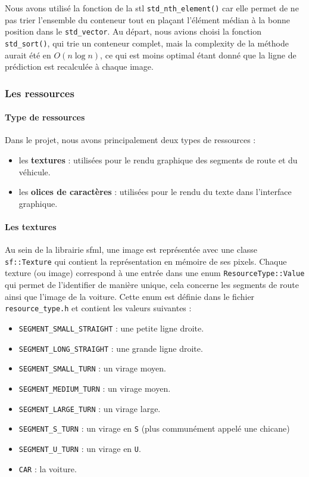 Nous avons utilisé la fonction de la \gls{stl} \texttt{\gls{std_nth_element}()}\cite{cpp_reference_std_nth_element} car elle permet de ne pas trier l'ensemble du conteneur tout en plaçant l'élément médian à la bonne position dans le \texttt{\gls{std_vector}}\cite{cpp_reference_vector}.
Au départ, nous avions choisi la fonction \texttt{\gls{std_sort}()}, qui trie un conteneur complet, mais la \gls{complexity} de la méthode aurait été en \( O(n \log n) \)\cite{cpp_reference_std_sort}, ce qui est moins optimal étant donné que la ligne de prédiction est recalculée à chaque image.


\subsubsection{Les ressources}\label{subsubsec:gestion-des-ressources}
\paragraph{Type de ressources}
Dans le projet, nous avons principalement deux types de ressources :
\begin{itemize}
    \item les \textbf{textures} : utilisées pour le rendu graphique des segments de route et du véhicule.
    \item les \textbf{olices de caractères} : utilisées pour le rendu du texte dans l'interface graphique.
\end{itemize}

\paragraph{Les textures}
Au sein de la librairie \gls{sfml}, une image est représentée avec une classe \texttt{sf::Texture}\cite{sfml_sf_texture} qui contient la représentation en mémoire de ses pixels.
Chaque texture (ou image) correspond à une entrée dans une enum \texttt{ResourceType::Value} qui permet de l'identifier de manière unique, cela concerne les segments de route ainsi que l'image de la voiture.
Cette enum est définie dans le fichier \texttt{resource\_type.h} et contient les valeurs suivantes :
\begin{itemize}
    \item \texttt{SEGMENT\_SMALL\_STRAIGHT} : une petite ligne droite.
    \item \texttt{SEGMENT\_LONG\_STRAIGHT} : une grande ligne droite.
    \item \texttt{SEGMENT\_SMALL\_TURN} : un virage moyen.
    \item \texttt{SEGMENT\_MEDIUM\_TURN} : un virage moyen.
    \item \texttt{SEGMENT\_LARGE\_TURN} : un virage large.
    \item \texttt{SEGMENT\_S\_TURN} : un virage en \texttt{S} (plus communément appelé une chicane)
    \item \texttt{SEGMENT\_U\_TURN} : un virage en \texttt{U}\@.
    \item \texttt{CAR} : la voiture.
\end{itemize}

